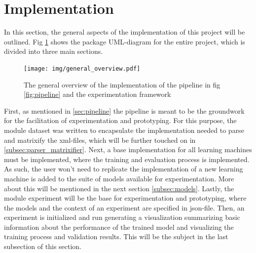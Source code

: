 	\section{Implementation}
		In this section, the general aspects of the implementation of this project will be outlined. Fig \ref{fig:overview} shows the package UML-diagram for the entire project, which is divided into three main sections.\newline
		\begin{figure}[H]
			\centering
			\texttt{[image: img/general\_overview.pdf]}
			\caption{The general overview of the implementation of the pipeline in fig \ref{fig:pipeline} and the experimentation framework}
			\label{fig:overview}
		\end{figure}
		First, as mentioned in \ref{sec:pipeline} the pipeline is meant to be the groundwork for the facilitation of experimentation and prototyping. For this purpose, the module dataset was written to encapsulate the implementation needed to parse and matrixify the xml-files, which will be further touched on in \ref{subsec:parser_matrixifier}. Next, a base implementation for all learning machines must be implemented, where the training and evaluation process is implemented. As such, the user won't need to replicate the implementation of a new learning machine is added to the suite of models available for experimentation. More about this will be mentioned in the next section \ref{subsec:models}. Lastly, the module experiment will be the base for experimentation and prototyping, where the models and the context of an experiment are specified in json-file. Then, an experiment is initialized and run generating a visualization summarizing basic information about the performance of the trained model and visualizing the training process and validation results. This will be the subject in the last subsection of this section.
